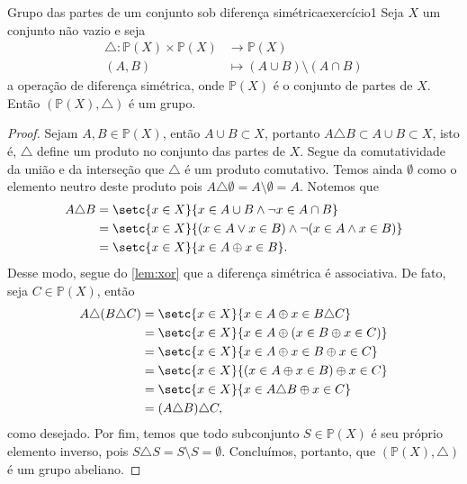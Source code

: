 \begin{proposition}{Grupo das partes de um conjunto sob diferença simétrica}{exercício1}
    Seja \(X\) um conjunto não vazio e seja
    \begin{align*}
        \triangle : \mathbb{P}(X) \times \mathbb{P}(X) &\to \mathbb{P}(X)\\
                                                 (A,B) &\mapsto (A \cup B) \setminus (A \cap B)
    \end{align*}
    a operação de diferença simétrica, onde \(\mathbb{P}(X)\) é o conjunto de partes de \(X\). Então \((\mathbb{P}(X), \triangle)\) é um grupo.
\end{proposition}
\begin{proof}
    Sejam \(A, B \in \mathbb{P}(X)\), então \(A \cup B \subset X\), portanto \(A \triangle B \subset A \cup B \subset X\), isto é, \(\triangle\) define um produto no conjunto das partes de \(X\). Segue da comutatividade da união e da interseção que \(\triangle\) é um produto comutativo. Temos ainda \(\emptyset\) como o elemento neutro deste produto pois \(A \triangle \emptyset = A \setminus \emptyset = A.\) Notemos que
    \begin{align*}
        A \triangle B &= \setc{x \in X}{x \in A \cup B \land \neg x \in A \cap B}\\
                      &= \setc{x \in X}{(x \in A \lor x \in B) \land \neg (x \in A \land x \in B)}\\
                      &= \setc{x \in X}{x \in A \oplus x \in B}.
    \end{align*}
    Desse modo, segue do \cref{lem:xor} que a diferença simétrica é associativa. De fato, seja \(C \in \mathbb{P}(X)\), então
    \begin{align*}
        A \triangle (B \triangle C) &= \setc{x \in X}{x \in A \oplus x \in B \triangle C}\\
                                    &= \setc{x \in X}{x \in A \oplus (x \in B \oplus x \in C)}\\
                                    &= \setc{x \in X}{x \in A \oplus x \in B \oplus x \in C}\\
                                    &= \setc{x \in X}{(x \in A \oplus x \in B) \oplus x \in C}\\
                                    &= \setc{x \in X}{x \in A \triangle B \oplus x \in C}\\
                                    &= (A \triangle B) \triangle C,
    \end{align*}
    como desejado. Por fim, temos que todo subconjunto \(S \in \mathbb{P}(X)\) é seu próprio elemento inverso, pois \(S \triangle S = S \setminus S = \emptyset\). Concluímos, portanto, que \((\mathbb{P}(X), \triangle)\) é um grupo abeliano.
\end{proof}
